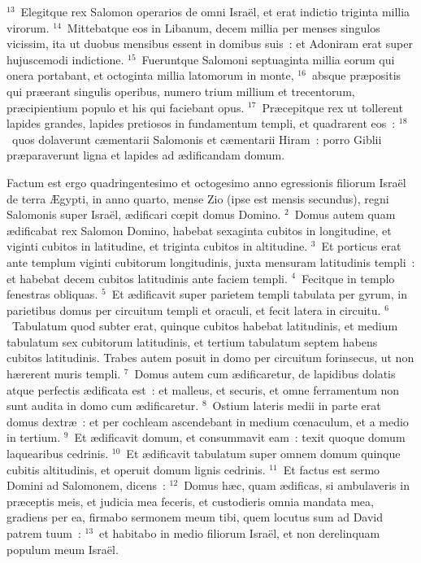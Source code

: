 ${}^{13}$~Elegitque rex Salomon operarios de omni Isra\"el, et erat indictio triginta millia virorum.
${}^{14}$~Mittebatque eos in Libanum, decem millia per menses singulos vicissim, ita ut duobus mensibus essent in domibus suis~: et Adoniram erat super hujuscemodi indictione.
${}^{15}$~Fueruntque Salomoni septuaginta millia eorum qui onera portabant, et octoginta millia latomorum in monte,
${}^{16}$~absque pr\ae positis qui pr\ae erant singulis operibus, numero trium millium et trecentorum, pr\ae cipientium populo et his qui faciebant opus.
${}^{17}$~Pr\ae cepitque rex ut tollerent lapides grandes, lapides pretiosos in fundamentum templi, et quadrarent eos~:
${}^{18}$~quos dolaverunt c\ae mentarii Salomonis et c\ae mentarii Hiram~: porro Giblii pr\ae paraverunt ligna et lapides ad \ae dificandam domum.

\lettrine[lines=10,image=true,loversize=0.05,lraise=-0.03]{F}{}actum est ergo quadringentesimo et octogesimo anno egressionis filiorum Isra\"el de terra \AE gypti, in anno quarto, mense Zio (ipse est mensis secundus), regni Salomonis super Isra\"el, \ae dificari cœpit domus Domino.
${}^{2}$~Domus autem quam \ae dificabat rex Salomon Domino, habebat sexaginta cubitos in longitudine, et viginti cubitos in latitudine, et triginta cubitos in altitudine.
${}^{3}$~Et porticus erat ante templum viginti cubitorum longitudinis, juxta mensuram latitudinis templi~: et habebat decem cubitos latitudinis ante faciem templi.
${}^{4}$~Fecitque in templo fenestras obliquas.
${}^{5}$~Et \ae dificavit super parietem templi tabulata per gyrum, in parietibus domus per circuitum templi et oraculi, et fecit latera in circuitu.
${}^{6}$~Tabulatum quod subter erat, quinque cubitos habebat latitudinis, et medium tabulatum sex cubitorum latitudinis, et tertium tabulatum septem habens cubitos latitudinis. Trabes autem posuit in domo per circuitum forinsecus, ut non h\ae rerent muris templi.
${}^{7}$~Domus autem cum \ae dificaretur, de lapidibus dolatis atque perfectis \ae dificata est~: et malleus, et securis, et omne ferramentum non sunt audita in domo cum \ae dificaretur.
${}^{8}$~Ostium lateris medii in parte erat domus dextr\ae~: et per cochleam ascendebant in medium cœnaculum, et a medio in tertium.
${}^{9}$~Et \ae dificavit domum, et consummavit eam~: texit quoque domum laquearibus cedrinis.
${}^{10}$~Et \ae dificavit tabulatum super omnem domum quinque cubitis altitudinis, et operuit domum lignis cedrinis.
${}^{11}$~Et factus est sermo Domini ad Salomonem, dicens~:
${}^{12}$~Domus h\ae c, quam \ae dificas, si ambulaveris in pr\ae ceptis meis, et judicia mea feceris, et custodieris omnia mandata mea, gradiens per ea, firmabo sermonem meum tibi, quem locutus sum ad David patrem tuum~:
${}^{13}$~et habitabo in medio filiorum Isra\"el, et non derelinquam populum meum Isra\"el.


